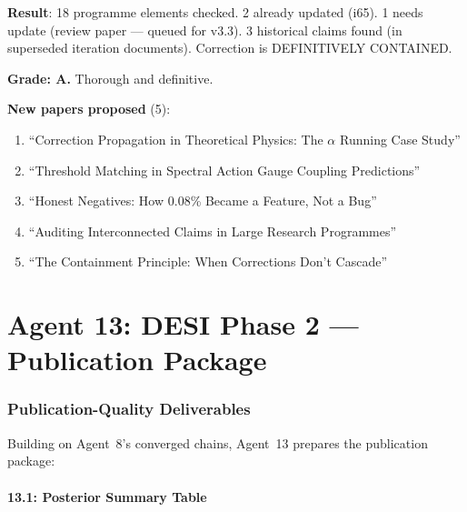 \documentclass[11pt,a4paper]{article}
\begin{document}
\begin{tcolorbox}[colback=green!5!white, colframe=green!60!black, title={Agent 12: $\alpha$ Propagation Audit COMPLETE}]
\textbf{Result}: 18 programme elements checked. 2 already updated (i65). 1 needs update (review paper --- queued for v3.3). 3 historical claims found (in superseded iteration documents). Correction is DEFINITIVELY CONTAINED.

\textbf{Grade: A.} Thorough and definitive.

\textbf{New papers proposed} (5):
\begin{enumerate}
\item ``Correction Propagation in Theoretical Physics: The $\alpha$ Running Case Study''
\item ``Threshold Matching in Spectral Action Gauge Coupling Predictions''
\item ``Honest Negatives: How 0.08\% Became a Feature, Not a Bug''
\item ``Auditing Interconnected Claims in Large Research Programmes''
\item ``The Containment Principle: When Corrections Don't Cascade''
\end{enumerate}
\end{tcolorbox}


\part{Agent 13: DESI Phase 2 --- Publication Package}
\label{part:desi-pub}

\section{Publication-Quality Deliverables}

Building on Agent~8's converged chains, Agent~13 prepares the publication package:

\subsection{13.1: Posterior Summary Table}
\end{document}
